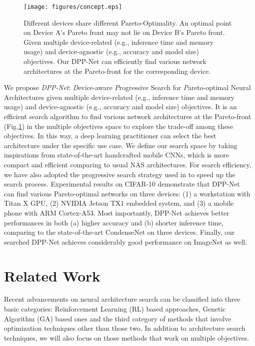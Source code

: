 \documentclass[runningheads]{llncs}
\def\eg{e.g.}
\begin{document}
\begin{figure}[t!]
\begin{minipage}{0.55\textwidth} 
\texttt{[image: figures/concept.eps]}
\end{minipage}%
\hspace{.01\textwidth}
\begin{minipage}{0.4\textwidth}
\caption{Different devices share different Pareto-Optimality. An optimal point on Device A's Pareto front may not lie on Device B's Pareto front. Given multiple device-related (\eg, inference time and memory usage) and device-agnostic (\eg, accuracy and model size) objectives. Our DPP-Net can efficiently find various network architectures at the Pareto-front for the corresponding device.}
\end{minipage}
\label{fig.concept}
\end{figure}

We propose \textit{DPP-Net}: \textit{D}evice-aware \textit{P}rogressive Search for \textit{P}areto-optimal Neural Architectures given multiple device-related (\eg, inference time and memory usage) and device-agnostic (\eg, accuracy and model size) objectives. It is an efficient search algorithm to find various network architectures at the Pareto-front (Fig.\ref{fig.concept}) in the multiple objectives space to explore the trade-off among these objectives. In this way, a deep learning practitioner can select the best architecture under the specific use case.
We define our search space by taking inspirations from state-of-the-art handcrafted mobile CNNs, which is more compact and efficient comparing to usual NAS architectures. For search efficiency, we have also adopted the progressive search strategy used in \cite{liu2017progressive} to speed up the search process. Experimental results on CIFAR-10 demonstrate that DPP-Net can find various Pareto-optimal networks on three devices: (1) a workstation with Titan X GPU, (2) NVIDIA Jetson TX1 embedded system, and (3) a mobile phone with ARM Cortex-A53. Most importantly, DPP-Net achieves better performances in both (a) higher accuracy and (b) shorter inference time, comparing to the state-of-the-art CondenseNet on three devices. Finally, our searched DPP-Net achieves considerably good performance on ImageNet as well.

\section{Related Work}
Recent advancements on neural architecture search can be classified into three basic categories: Reinforcement Learning (RL) based approaches,  Genetic Algorithm (GA) based ones and the third category of methods that involve optimization techniques other than those two. In addition to architecture search techniques, we will also focus on those methods that work on multiple objectives.
\end{document}
